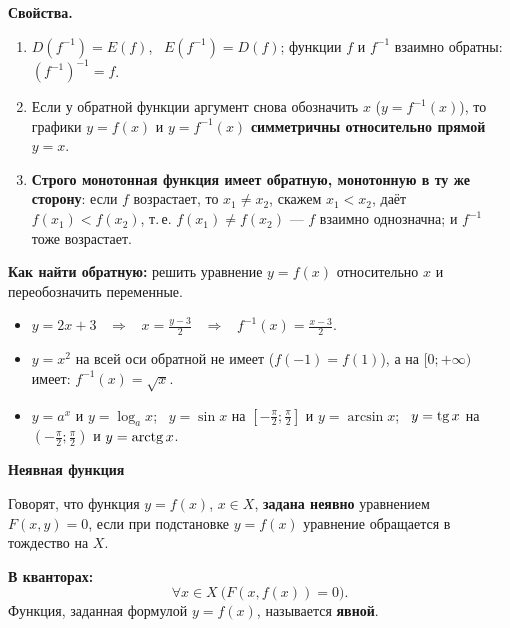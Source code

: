 \documentclass[a4paper,11pt]{article}
\newcommand{\kv}{\par\noindent\textbf{\textcolor{oprc!85!black}{В кванторах:}}}
\newcommand{\podr}[1]{\par\needspace{8\baselineskip}\medskip
  {\large\bfseries\textcolor{oprc!80!black}{#1}}\par\nopagebreak\smallskip}
\begin{document}
\textbf{Свойства.}
\begin{enumerate}[leftmargin=*]
  \item $D(f^{-1}) = E(f)$, \ $E(f^{-1}) = D(f)$; функции $f$ и $f^{-1}$ взаимно обратны: $(f^{-1})^{-1} = f$.
  \item Если у обратной функции аргумент снова обозначить $x$ ($y = f^{-1}(x)$), то графики $y = f(x)$ и $y = f^{-1}(x)$
        \textbf{симметричны относительно прямой $y = x$}.
  \item \textbf{Строго монотонная функция имеет обратную, монотонную в ту же сторону}: если $f$ возрастает, то
        $x_1 \ne x_2$, скажем $x_1 < x_2$, даёт $f(x_1) < f(x_2)$, т.\,е. $f(x_1) \ne f(x_2)$ --- $f$ взаимно однозначна;
        и $f^{-1}$ тоже возрастает.
\end{enumerate}

\textbf{Как найти обратную:} решить уравнение $y = f(x)$ относительно $x$ и переобозначить переменные.
\begin{itemize}[leftmargin=*]
  \item $y = 2x + 3$ \ $\Rightarrow$ \ $x = \frac{y - 3}{2}$ \ $\Rightarrow$ \ $f^{-1}(x) = \frac{x - 3}{2}$.
  \item $y = x^2$ на всей оси обратной не имеет ($f(-1) = f(1)$), а на $[0; +\infty)$ имеет: $f^{-1}(x) = \sqrt{x}$.
  \item $y = a^x$ и $y = \log_a x$; \ $y = \sin x$ на $\left[-\frac\pi2; \frac\pi2\right]$ и $y = \arcsin x$;
        \ $y = \operatorname{tg} x$ на $\left(-\frac\pi2; \frac\pi2\right)$ и $y = \operatorname{arctg} x$.
\end{itemize}

\begin{center}
\end{center}

\podr{Неявная функция}

\begin{opr}
Говорят, что функция $y = f(x)$, $x \in X$, \textbf{задана неявно} уравнением $F(x, y) = 0$, если при подстановке $y = f(x)$
уравнение обращается в тождество на $X$.
\kv
\[
  \forall x \in X\ \bigl( F(x, f(x)) = 0 \bigr).
\]
Функция, заданная формулой $y = f(x)$, называется \textbf{явной}.
\end{opr}
\end{document}
